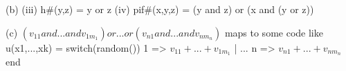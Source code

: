 (b) (iii) h#(y,z) = y or z
    (iv) pif#(x,y,z) = (y and z) or (x and (y or z))

(c) $(v_{11} and ... and v_{1m_1}) or ... or (v_{n1} and ... and v_{nm_n})$
maps to some code like
u(x1,...,xk) = switch(random())
    1 => $v_{11} + ... + v_{1m_1}$ |
    ...
    n => $v_{n1} + ... + v_{nm_n}$
end
